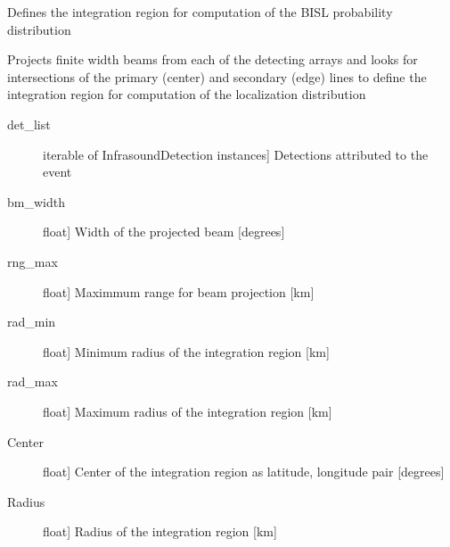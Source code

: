 \documentclass[letterpaper,10pt,english]{sphinxmanual}
\begin{document}
\begin{fulllineitems}
\label{\detokenize{infrapy.location:infrapy.location.bisl.set_region}}
Defines the integration region for computation of the BISL probability distribution

Projects finite width beams from each of the detecting arrays and looks for intersections
of the primary (center) and secondary (edge) lines to define the integration region
for computation of the localization distribution
\begin{description}
\item[{det\_list}] \leavevmode{[}iterable of InfrasoundDetection instances{]}
Detections attributed to the event

\item[{bm\_width}] \leavevmode{[}float{]}
Width of the projected beam {[}degrees{]}

\item[{rng\_max}] \leavevmode{[}float{]}
Maximmum range for beam projection {[}km{]}

\item[{rad\_min}] \leavevmode{[}float{]}
Minimum radius of the integration region {[}km{]}

\item[{rad\_max}] \leavevmode{[}float{]}
Maximum radius of the integration region {[}km{]}

\end{description}
\begin{description}
\item[{Center}] \leavevmode{[}float{]}
Center of the integration region as latitude, longitude pair {[}degrees{]}

\item[{Radius}] \leavevmode{[}float{]}
Radius of the integration region {[}km{]}

\end{description}

\end{fulllineitems}

\end{document}
